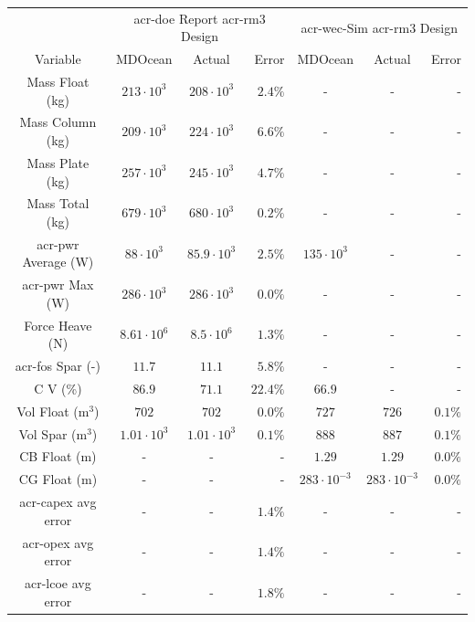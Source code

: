 \begin{tabular}{c|c|c|r|c|c|r}
& \multicolumn{3}{c|}{\gls{acr-doe} Report \gls{acr-rm3} Design \cite{RM3}} & \multicolumn{3}{c}{\gls{acr-wec}-Sim \gls{acr-rm3} Design \cite{ruehl_wec-simwec-sim_2025}} \\   
Variable & MDOcean & Actual & Error & MDOcean  & Actual  & Error \\ 
\hline 
Mass Float (kg) & $213 \cdot 10^{3}$ & $208 \cdot 10^{3}$ & $2.4\% $ & - & - & - \\ 
Mass Column (kg) & $209 \cdot 10^{3}$ & $224 \cdot 10^{3}$ & $6.6\% $ & - & - & - \\ 
Mass Plate (kg) & $257 \cdot 10^{3}$ & $245 \cdot 10^{3}$ & $4.7\% $ & - & - & - \\ 
Mass Total (kg) & $679 \cdot 10^{3}$ & $680 \cdot 10^{3}$ & $0.2\% $ & - & - & - \\ 
\gls{acr-pwr} Average (W) & $88 \cdot 10^{3}$ & $85.9 \cdot 10^{3}$ & $2.5\% $ & $135 \cdot 10^{3}$ & - & - \\ 
\gls{acr-pwr} Max (W) & $286 \cdot 10^{3}$ & $286 \cdot 10^{3}$ & $0.0\% $ & - & - & - \\ 
Force Heave (N) & $8.61 \cdot 10^{6}$ & $8.5 \cdot 10^{6}$ & $1.3\% $ & - & - & - \\ 
\gls{acr-fos} Spar (-) & $11.7 $ & $11.1 $ & $5.8\% $ & - & - & - \\ 
C V (\%) & $86.9 $ & $71.1 $ & $22.4\% $ & $66.9 $ & - & - \\ 
Vol Float (m$^3$) & $702 $ & $702 $ & $0.0\% $ & $727 $ & $726 $ & $0.1\% $ \\ 
Vol Spar (m$^3$) & $1.01 \cdot 10^{3}$ & $1.01 \cdot 10^{3}$ & $0.1\% $ & $888 $ & $887 $ & $0.1\% $ \\ 
CB Float (m) & - & - & - & $1.29 $ & $1.29 $ & $0.0\% $ \\ 
CG Float (m) & - & - & - & $283 \cdot 10^{-3}$ & $283 \cdot 10^{-3}$ & $0.0\% $ \\ 
\gls{acr-capex} avg error & - & - & $1.4\% $ & - & - & - \\ 
\gls{acr-opex} avg error & - & - & $1.4\% $ & - & - & - \\ 
\gls{acr-lcoe} avg error & - & - & $1.8\% $ & - & - & - \\ 
\end{tabular}